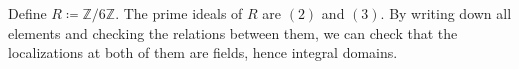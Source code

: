 Define $R\coloneqq \mathbb{Z}/6\mathbb{Z}$. The prime ideals of $R$ are $(2)$
and $(3)$. By writing down all elements and checking the relations between them,
we can check that the localizations at both of them are fields, hence integral domains.
